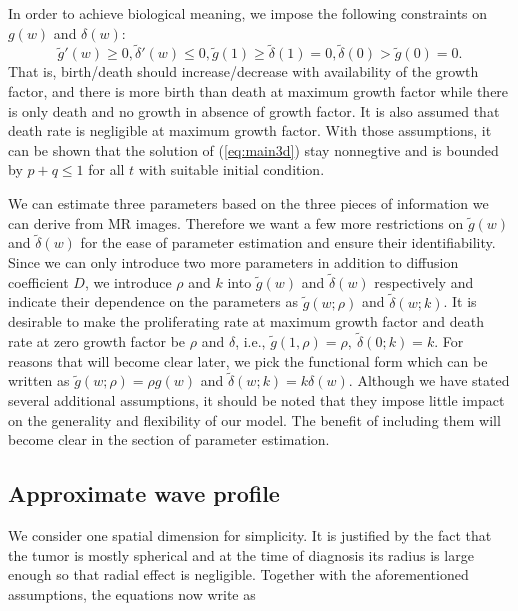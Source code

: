 \documentclass{aims}
\numberwithin{equation}{section}
\begin{document}
In order to achieve biological meaning, we impose the following constraints
on $g(w)$ and $\delta(w)$: 
\begin{equation}
\tilde{g}'(w)\ge0,\tilde{\delta}'(w)\le0,\tilde{g}(1)\ge\tilde{\delta}(1)=0,\tilde{\delta}(0)>\tilde{g}(0)=0.\label{eq:1st assumption}
\end{equation}
That is, birth/death should increase/decrease with availability of
the growth factor, and there is more birth than death at maximum growth
factor while there is only death and no growth in absence of growth
factor. It is also assumed that death rate is negligible at maximum
growth factor. With those assumptions, it can be shown that the solution
of (\ref{eq:main3d}) stay nonnegtive and is bounded by $p+q\le1$
for all $t$ with suitable initial condition. 

We can estimate three parameters based on the three pieces of information
we can derive from MR images. Therefore we want a few more restrictions
on $\tilde{g}(w)$ and $\tilde{\delta}(w)$ for the ease of parameter
estimation and ensure their identifiability. Since we can only introduce
two more parameters in addition to diffusion coefficient $D$, we
introduce $\rho$ and $k$ into $\tilde{g}(w)$ and $\tilde{\delta}(w)$
respectively and indicate their dependence on the parameters as $\tilde{g}(w;\rho)$
and $\tilde{\delta}(w;k)$. It is desirable to make the proliferating
rate at maximum growth factor and death rate at zero growth factor
be $\rho$ and $\delta$, i.e., $\tilde{g}(1,\rho)=\rho,\ \tilde{\delta}(0;k)=k$.
For reasons that will become clear later, we pick the functional form
which can be written as $\tilde{g}(w;\rho)=\rho g(w)$ and $\tilde{\delta}(w;k)=k\delta(w)$.
Although we have stated several additional assumptions, it should
be noted that they impose little impact on the generality and flexibility
of our model. The benefit of including them will become clear in the
section of parameter estimation. 

\subsection{Approximate wave profile}
We consider one spatial dimension for simplicity. It is justified
by the fact that the tumor is mostly spherical and at the time of
diagnosis its radius is large enough so that radial effect is negligible.
Together with the aforementioned assumptions, the equations now write
as 
\end{document}
